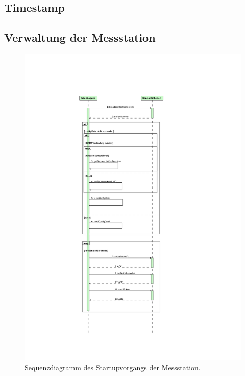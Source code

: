 \subsection{Timestamp}\label{subsec.sw_timestamp}

\subsection{Verwaltung der Messstation}\label{subsec.sw_busverwaltung}

\begin{figure}[H]
	\centering
		\includegraphics[height=0.9\textheight]{images/magicdraw/StartUpSequenz.pdf}
	\caption{Sequenzdiagramm des Startupvorgangs der Messstation.}
	\label{fig.seq_startup}
\end{figure}

